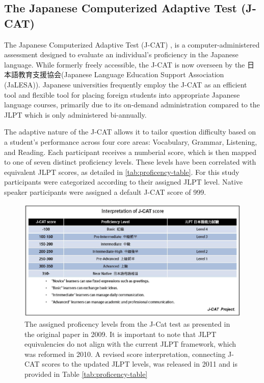 \subsection{The Japanese Computerized Adaptive Test (J-CAT)}
\label{j-cat}


The Japanese Computerized Adaptive Test (J-CAT) \citep{Imai2009}, is a computer-administered assessment
designed to evaluate an
individual's proficiency in the Japanese language. While formerly freely accessible, the J-CAT is now overseen by
the  日本語教育支援協会(Japanese Language Education Support Association (JaLESA)). Japanese
universities frequently
employ the J-CAT as an efficient tool and flexible tool for placing foreign students into appropriate Japanese
language courses, primarily due to its on-demand administration compared to the JLPT which is only
administered bi-annually.

The adaptive nature of the J-CAT allows it to tailor question difficulty based on a student's performance across
four core areas: Vocabulary, Grammar, Listening, and Reading. Each participant receives a numberial score, which is
then mapped to one of seven distinct proficiency levels. These levels have been correlated with equivalent JLPT
scores, as detailed in \ref{tab:proficency-table}. For this study participants were categorized according to their
assigned JLPT level. Native speaker participants were assigned a default J-CAT score of 999.

\begin{figure}[h!]
    \centering
    \includegraphics[scale=.3]{img/JCatScores.png}
    \caption{The assigned proficency levels from the J-Cat test as presented in the original paper in  2009. It is important to note that JLPT equivalencies do not align with the current JLPT framework, which was reformed in 2010. A revised score interpretation, connecting J-CAT scores to the updated JLPT levels, was released in 2011 and is provided in Table \ref{tab:proficency-table} }
    \label{fig:JCatLevels}
\end{figure}


